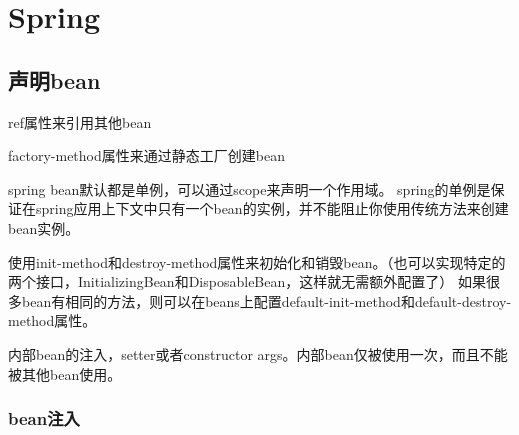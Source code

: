\chapter{Spring}

\section{声明bean}


ref属性来引用其他bean

factory-method属性来通过静态工厂创建bean

spring bean默认都是单例，可以通过scope来声明一个作用域。 spring的单例是保证在spring应用上下文中只有一个bean的实例，并不能阻止你使用传统方法来创建bean实例。

使用init-method和destroy-method属性来初始化和销毁bean。（也可以实现特定的两个接口，InitializingBean和DisposableBean，这样就无需额外配置了）
如果很多bean有相同的方法，则可以在beans上配置default-init-method和default-destroy-method属性。

内部bean的注入，setter或者constructor args。内部bean仅被使用一次，而且不能被其他bean使用。


\subsection{bean注入}




